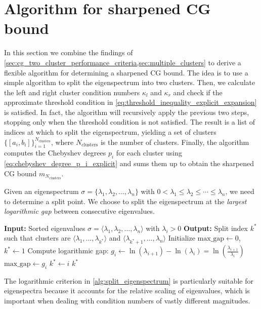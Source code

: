 \section{Algorithm for sharpened CG bound}\label{sec:cg_sharpened_convrate_multiple_clusters_algorithm}
In this section we combine the findings of \cref{sec:cg_two_cluster_performance_criteria,sec:multiple_clusters} to derive a flexible algorithm for determining a sharpened CG bound. The idea is to use a simple algorithm to split the eigenspectrum into two clusters. Then, we calculate the left and right cluster condition numbers $\kappa_l$ and $\kappa_r$ and check if the approximate threshold condition in \cref{eq:threshold_inequality_explicit_expansion} is satisfied. In fact, the algorithm will recursively apply the previous two steps, stopping only when the threshold condition is not satisfied. The result is a list of indices at which to split the eigenspectrum, yielding a set of clusters $\{[a_i, b_i]\}_{i=1}^{N_{\text{clusters}}}$, where $N_{\text{clusters}}$ is the number of clusters. Finally, the algorithm computes the Chebyshev degrees $p_i$ for each cluster using \cref{eq:chebyshev_degree_p_i_explicit} and sums them up to obtain the sharpened CG bound $m_{N_{\text{clusters}}}$.

Given an eigenspectrum $\sigma = \{\lambda_1, \lambda_2, \ldots, \lambda_n\}$ with $0 < \lambda_1 \leq \lambda_2 \leq \cdots \leq \lambda_n$, we need to determine a split point. We choose to split the eigenspectrum at the \textit{largest logarithmic gap} between consecutive eigenvalues.
\begin{algorithm}[H]
    \caption{$\operatorname{SplitEigenspectrum}(\sigma)$}
    \begin{algorithmic}[1]
        \State \textbf{Input:} Sorted eigenvalues $\sigma = \langle\lambda_1, \lambda_2, \ldots, \lambda_n\rangle$ with $\lambda_i > 0$
        \State \textbf{Output:} Split index $k^*$ such that clusters are $\langle\lambda_1, \ldots, \lambda_{k^*}\rangle$ and $\langle\lambda_{k^*+1}, \ldots, \lambda_n\rangle$
        \State Initialize $\text{max\_gap} \gets 0$, $k^* \gets 1$
            \State Compute logarithmic gap: $g_i \gets \ln(\lambda_{i+1}) - \ln(\lambda_i) = \ln\left(\frac{\lambda_{i+1}}{\lambda_i}\right)$
                \State $\text{max\_gap} \gets g_i$
                \State $k^* \gets i$
            \EndIf
        \EndFor
        \State \Return $k^*$
    \end{algorithmic}
    \label{alg:split_eigenspectrum}
\end{algorithm}
The logarithmic criterion in \cref{alg:split_eigenspectrum} is particularly suitable for eigenspectra because it accounts for the relative scaling of eigenvalues, which is important when dealing with condition numbers of vastly different magnitudes.

